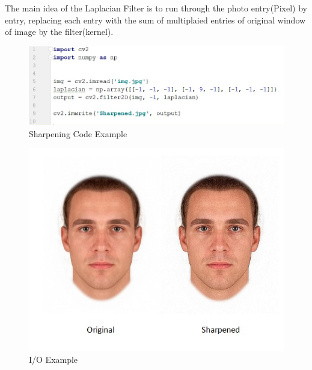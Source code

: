 The main idea of the Laplacian Filter is to run through the photo entry(Pixel) by entry, replacing each entry with the sum of multiplaied entries of original window of image by the filter(kernel).
\begin{figure}[H]
	\centering
	\includegraphics[width=\linewidth]{images/sharpening_code.jpg}
	\caption{Sharpening Code Example}
\end{figure}
\begin{figure}[H]
	\centering
	\includegraphics[width=\linewidth]{images/Sharpened.jpg}
	\caption{I/O Example}
\end{figure}


